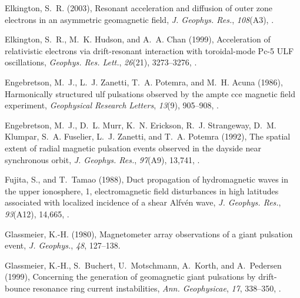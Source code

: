 \documentclass[draft,linenumbers]{agujournal}
\begin{document}
\begin{thebibliography}{62}
Elkington, S.~R. (2003), Resonant acceleration and diffusion of outer zone
  electrons in an asymmetric geomagnetic field, \textit{J. Geophys. Res.},
  \textit{108}(A3), .

Elkington, S.~R., M.~K. Hudson, and A.~A. Chan (1999), Acceleration of
  relativistic electrons via drift-resonant interaction with toroidal-mode
  {Pc-5} {ULF} oscillations, \textit{Geophys. Res. Lett.}, \textit{26}(21),
  3273--3276, .

Engebretson, M.~J., L.~J. Zanetti, T.~A. Potemra, and M.~H. Acuna (1986),
  Harmonically structured ulf pulsations observed by the ampte cce magnetic
  field experiment, \textit{Geophysical Research Letters}, \textit{13}(9),
  905--908, .

Engebretson, M.~J., D.~L. Murr, K.~N. Erickson, R.~J. Strangeway, D.~M.
  Klumpar, S.~A. Fuselier, L.~J. Zanetti, and T.~A. Potemra (1992), The spatial
  extent of radial magnetic pulsation events observed in the dayside near
  synchronous orbit, \textit{J. Geophys. Res.}, \textit{97}(A9), 13,741,
  .

Fujita, S., and T.~Tamao (1988), Duct propagation of hydromagnetic waves in the
  upper ionosphere, 1, electromagnetic field disturbances in high latitudes
  associated with localized incidence of a shear {Alfv{\'e}n} wave, \textit{J.
  Geophys. Res.}, \textit{93}(A12), 14,665, .

Glassmeier, K.-H. (1980), Magnetometer array observations of a giant pulsation
  event, \textit{J. Geophys.}, \textit{48}, 127--138.

Glassmeier, K.-H., S.~Buchert, U.~Motschmann, A.~Korth, and A.~Pedersen (1999),
  Concerning the generation of geomagnetic giant pulsations by drift-bounce
  resonance ring current instabilities, \textit{Ann. Geophysicae}, \textit{17},
  338--350, .


\end{thebibliography}
\end{document}
